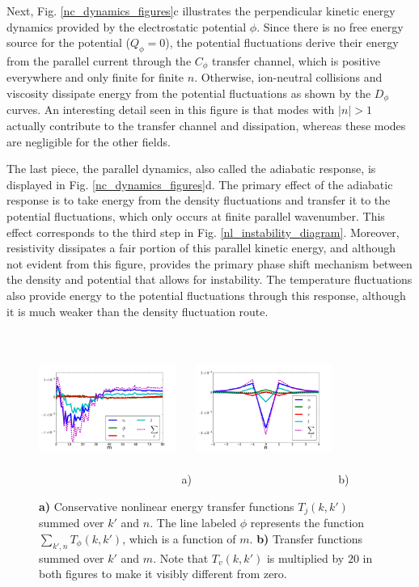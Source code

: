 \documentclass[showpacs,preprintnumbers,amsmath,amssymb,superscriptaddress]{revtex4}
\begin{document}
Next, Fig. \ref{nc_dynamics_figures}c illustrates the perpendicular kinetic energy dynamics provided by the electrostatic potential $\phi$. 
Since there is no free energy source for the potential ($Q_\phi=0$),
the potential fluctuations derive their energy from the parallel current through the $C_\phi$ transfer channel, which is positive everywhere and only finite for finite $n$. Otherwise, ion-neutral
collisions and viscosity dissipate energy from the potential fluctuations as shown by the $D_\phi$ curves. An interesting detail seen in this figure is that modes with $|n| > 1$ actually
contribute to the transfer channel and dissipation, whereas these modes are negligible for the other fields. 

The last piece, the parallel dynamics, also called the adiabatic response, is displayed in Fig. \ref{nc_dynamics_figures}d. 
The primary effect of the adiabatic response is to take energy from the density
fluctuations and transfer it to the potential fluctuations, which only occurs at finite parallel wavenumber. This effect corresponds to the third step in Fig. \ref{nl_instability_diagram}.
Moreover, resistivity dissipates a fair portion of this parallel kinetic energy, and although not evident from this figure, provides
the primary phase shift mechanism between the density and potential that allows for instability. The temperature fluctuations also provide energy to the potential fluctuations
through this response, although it is much weaker than the density fluctuation route. 


\begin{figure}
\includegraphics[width=0.40\textwidth,height=50mm]{T_m}~a)
\hfil
\includegraphics[width=0.40\textwidth,height=50mm]{T_n}~b)
\hfil
\caption{\textbf{a)} Conservative nonlinear energy transfer functions $T_j(k,k')$ summed over $k'$ and $n$. The line labeled $\phi$ represents the function $\sum_{k',n} T_\phi(k,k')$,
which is a function of $m$. 
\textbf{b)} Transfer functions summed over $k'$ and $m$. Note that $T_v(k,k')$ is multiplied by $20$ in both figures to make it visibly different from zero.}
\label{conservative_transfers}
\end{figure}
\end{document}
